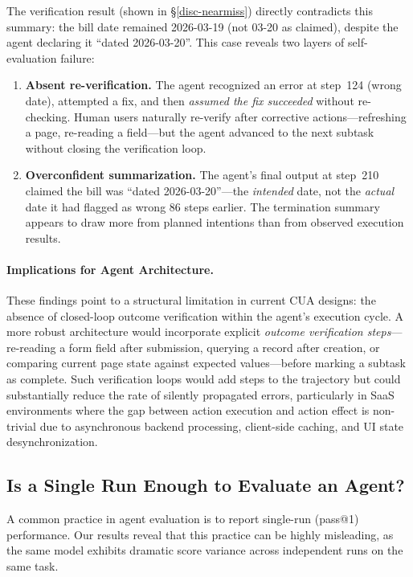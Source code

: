 The verification result (shown in \S\ref{disc-nearmiss}) directly contradicts this summary: the bill date remained 2026-03-19 (not 03-20 as claimed), despite the agent declaring it ``dated 2026-03-20''. This case reveals two layers of self-evaluation failure:

\begin{enumerate}[leftmargin=1.5em]
\item \textbf{Absent re-verification.} The agent recognized an error at step~124 (wrong date), attempted a fix, and then \emph{assumed the fix succeeded} without re-checking. Human users naturally re-verify after corrective actions---refreshing a page, re-reading a field---but the agent advanced to the next subtask without closing the verification loop.

\item \textbf{Overconfident summarization.} The agent's final output at step~210 claimed the bill was ``dated 2026-03-20''---the \emph{intended} date, not the \emph{actual} date it had flagged as wrong 86 steps earlier. The termination summary appears to draw more from planned intentions than from observed execution results.
\end{enumerate}

\paragraph{Implications for Agent Architecture.}
These findings point to a structural limitation in current CUA designs: the absence of closed-loop outcome verification within the agent's execution cycle. A more robust architecture would incorporate explicit \emph{outcome verification steps}---re-reading a form field after submission, querying a record after creation, or comparing current page state against expected values---before marking a subtask as complete. Such verification loops would add steps to the trajectory but could substantially reduce the rate of silently propagated errors, particularly in SaaS environments where the gap between action execution and action effect is non-trivial due to asynchronous backend processing, client-side caching, and UI state desynchronization.


\subsection{Is a Single Run Enough to Evaluate an Agent?}
\label{disc-var}

A common practice in agent evaluation is to report single-run (pass@1) performance. Our results reveal that this practice can be highly misleading, as the same model exhibits dramatic score variance across independent runs on the same task.

